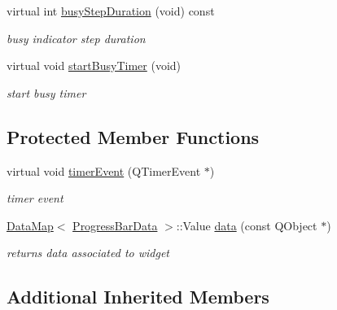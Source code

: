 \begin{DoxyCompactItemize}
\mbox{\label{class_progress_bar_engine_a6ae38ebf2bd7a5e3961cb4d47f1ae32d}} 
virtual int \hyperlink{class_progress_bar_engine_a6ae38ebf2bd7a5e3961cb4d47f1ae32d}{busy\+Step\+Duration} (void) const
\begin{DoxyCompactList}\small\item\em busy indicator step duration \end{DoxyCompactList}\item 
\mbox{\label{class_progress_bar_engine_a02fb3a58747fd96a5210cab15cfdb0a4}} 
virtual void \hyperlink{class_progress_bar_engine_a02fb3a58747fd96a5210cab15cfdb0a4}{start\+Busy\+Timer} (void)
\begin{DoxyCompactList}\small\item\em start busy timer \end{DoxyCompactList}\end{DoxyCompactItemize}
\subsection*{Protected Member Functions}
\begin{DoxyCompactItemize}
\item 
\mbox{\label{class_progress_bar_engine_aa8f98d22baf80da209ac51ad7fd10267}} 
virtual void \hyperlink{class_progress_bar_engine_aa8f98d22baf80da209ac51ad7fd10267}{timer\+Event} (Q\+Timer\+Event $\ast$)
\begin{DoxyCompactList}\small\item\em timer event \end{DoxyCompactList}\item 
\mbox{\label{class_progress_bar_engine_adff70ad5795cd60e4786dc5e69f643cc}} 
\hyperlink{class_data_map}{Data\+Map}$<$ \hyperlink{class_progress_bar_data}{Progress\+Bar\+Data} $>$\+::Value \hyperlink{class_progress_bar_engine_adff70ad5795cd60e4786dc5e69f643cc}{data} (const Q\+Object $\ast$)
\begin{DoxyCompactList}\small\item\em returns data associated to widget \end{DoxyCompactList}\end{DoxyCompactItemize}
\subsection*{Additional Inherited Members}


